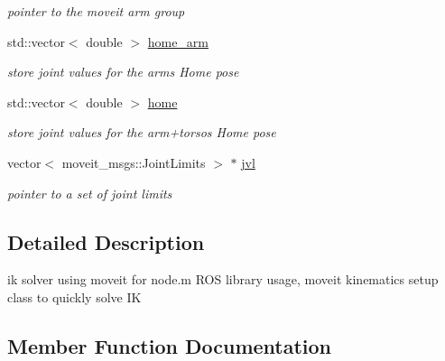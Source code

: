 \begin{DoxyCompactItemize}
\begin{DoxyCompactList}\small\item\em pointer to the moveit arm group \end{DoxyCompactList}\item 
\mbox{\label{classMOVEIT__IK_a54fb3f15c72e83b37c1aff9bb48dddd8}} 
std\+::vector$<$ double $>$ \hyperlink{classMOVEIT__IK_a54fb3f15c72e83b37c1aff9bb48dddd8}{home\+\_\+arm}
\begin{DoxyCompactList}\small\item\em store joint values for the arm\textquotesingle{}s \textquotesingle{}Home\textquotesingle{} pose \end{DoxyCompactList}\item 
\mbox{\label{classMOVEIT__IK_a40b5380aca0f43ac807a88a521c62eaf}} 
std\+::vector$<$ double $>$ \hyperlink{classMOVEIT__IK_a40b5380aca0f43ac807a88a521c62eaf}{home}
\begin{DoxyCompactList}\small\item\em store joint values for the arm+torso\textquotesingle{}s \textquotesingle{}Home\textquotesingle{} pose \end{DoxyCompactList}\item 
\mbox{\label{classMOVEIT__IK_a189c9c745418ad99ab7236cabec0155a}} 
vector$<$ moveit\+\_\+msgs\+::\+Joint\+Limits $>$ $\ast$ \hyperlink{classMOVEIT__IK_a189c9c745418ad99ab7236cabec0155a}{jvl}
\begin{DoxyCompactList}\small\item\em pointer to a set of joint limits \end{DoxyCompactList}\end{DoxyCompactItemize}


\subsection{Detailed Description}
ik solver using moveit for node.\+m R\+OS library usage, moveit kinematics setup class to quickly solve IK 

\subsection{Member Function Documentation}
\mbox{\label{classMOVEIT__IK_aecc7b36de162360f11ad460d3fb2321c}} 
